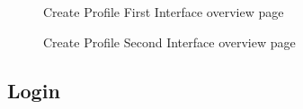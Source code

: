 \begin{figure}[H]
    \centering
    \caption{ Create Profile First Interface overview page}
    \label{fig:Create-Profile-First-Interface-overview-page}
\end{figure}

\begin{figure}[H]
    \centering
    \caption{ Create Profile Second Interface overview page}
    \label{fig:Create-Profile-Second-Interface-overview-page}
\end{figure}


\subsection{Login}


